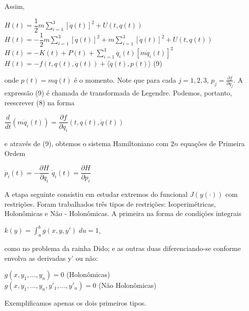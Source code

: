 \documentclass[12pt, a4paper]{article}
\begin{document}
Assim, 
\begin{center}
$H(t) = \dfrac{1}{2} m \sum_{i=1}^{3} [\dot{q}(t)]^2 + U(t,q(t))$\\
$H(t) = -\dfrac{1}{2} m \sum_{i=1}^{3} [\dot{q}(t)]^2 + m \sum_{i=1}^{3} [\dot{q}(t)]^2 + U(t,q(t))$\\
$H(t) = -K(t) + P(t) + \sum_{i=1}^{3} \dot{q_i}(t)[m\dot{q}_i(t)]^2 $\\
$H(t) = -f(t, q(t), \dot{q}(t)) + \langle \dot{q}(t), p(t) \rangle$ (9)
\end{center}

onde $p(t) = mq(t)$ é o momento. Note que para cada $j = 1,2,3$, $p_j=  \frac{\partial f}{\partial \dot{q}_j}$. A expressão (9) é chamada de transformada de Legendre. Podemos, portanto, reescrever (8) na forma

\begin{center}
$\dfrac{d}{dt}(m\dot{q}_i(t)) = \dfrac{\partial f}{\partial \dot{q}_i}(t, q(t), \dot{q}(t))$
\end{center}

e através de (9), obtemos o sistema Hamiltoniano com $2n$ equações de Primeira Ordem

\begin{center}
$\dot{p}_i(t)= -\dfrac{\partial H}{\partial q_i} $
$\dot{q}_i(t)=  \dfrac{\partial H}{\partial p_i} $

\end{center}


A etapa seguinte consistiu em estudar extremos do funcional $J(y(\cdot))$ com restrições. Foram trabalhados três tipos de restrições: Isoperimétricas, Holonômicas e Não - Holonômicas. A primeira na forma de condições integrais

\begin{center}
$k(y) = \int_a^b g(x, y, y') \; du = 1$,
\end{center}

como no problema da rainha Dido; e as outras duas diferenciando-se conforme envolva as derivadas y' ou não: 

\begin{center}
$g(x,y_1,...,y_n) = 0 $ (Holonômicas)\\
$g(x,y_1,...,y_n, y'_1,...,y'_n) = 0 $ (Não Holonômicas)
\end{center}

Exemplificamos apenas os dois primeiros tipos.
\end{document}
